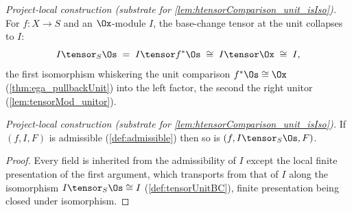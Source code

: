 \begin{definition}
  \label{def:tensorUnitBC}
  \textit{Project-local construction (substrate for \cref{lem:htensorComparison_unit_isIso}).}
  For $f : X \to S$ and an $\Ox$-module $I$, the base-change tensor at the unit collapses to $I$:
  \[
    I \tensor_S \Os \;=\; I \tensor f^*\Os \;\cong\; I \tensor \Ox \;\cong\; I,
  \]
  the first isomorphism whiskering the unit comparison $f^*\Os \cong \Ox$ (\cref{thm:ega_pullbackUnit})
  into the left factor, the second the right unitor (\cref{lem:tensorMod_unitor}).
\end{definition}

\begin{lemma}
  \label{lem:admissible_tensorUnit}
  \textit{Project-local construction (substrate for \cref{lem:htensorComparison_unit_isIso}).}
  If $(f, I, F)$ is admissible (\cref{def:admissible}) then so is $(f, I \tensor_S \Os, F)$.
  \begin{proof}
    Every field is inherited from the admissibility of $I$ except the local finite presentation of
    the first argument, which transports from that of $I$ along the isomorphism
    $I \tensor_S \Os \cong I$ (\cref{def:tensorUnitBC}), finite presentation being closed under
    isomorphism.
  \end{proof}
\end{lemma}

